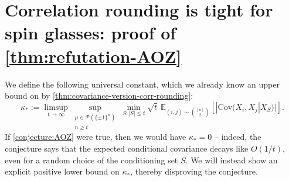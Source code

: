 \documentclass[11pt, oneside, english]{article}
\newcommand{\bE}{\mathbb{E}}
\newcommand{\Cov}{\mathrm{Cov}}
\newcommand{\E}{\bE}      %
\theoremstyle{definition}
\theoremstyle{plain}
\begin{document}
\section{Correlation rounding is tight for spin glasses: proof of \cref{thm:refutation-AOZ}}
\label{s:odonnell}
We define the following universal constant, which we already know an upper bound on by \cref{thm:covariance-version-corr-rounding}:
\[ \kappa_* := \limsup_{t \to \infty} \sup_{\substack{\mu \in \mathcal{P}(\{\pm 1\}^n) \\ n \ge t}} \min_{S : |S| \le t} \sqrt{t}\ \E_{(i,j) \sim {[n] \choose 2}}[|\Cov(X_i,X_j | X_S)|]. \]
If \cref{conjecture:AOZ} were true, then we would have $\kappa_* = 0$ -- indeed, the conjecture says that
the expected conditional covariance decays like $O(1/t)$, even for a random choice of the conditioning set $S$. We will instead show an explicit positive lower bound on $\kappa_*$, thereby disproving the conjecture. 
\end{document}
